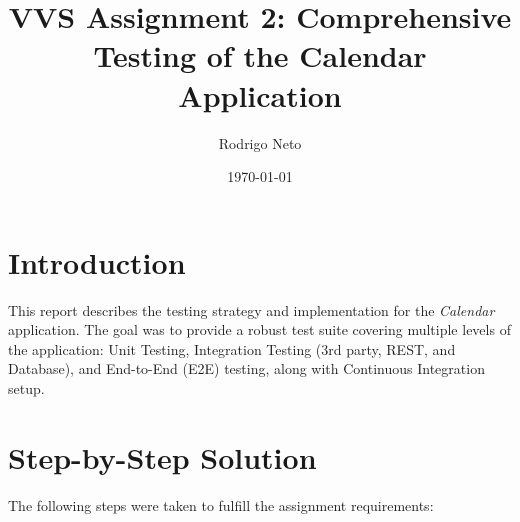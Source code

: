 \documentclass[11pt]{article}
\title{VVS Assignment 2: Comprehensive Testing of the Calendar Application}
\author{Rodrigo Neto}
\date{\today}
\begin{document}
  \maketitle

  \section{Introduction}
  This report describes the testing strategy and implementation for the \textit{Calendar} application. The goal was to provide a robust test suite covering multiple levels of the application: Unit Testing, Integration Testing (3rd party, REST, and Database), and End-to-End (E2E) testing, along with Continuous Integration setup.

  \section{Step-by-Step Solution}
  The following steps were taken to fulfill the assignment requirements:
\end{document}
